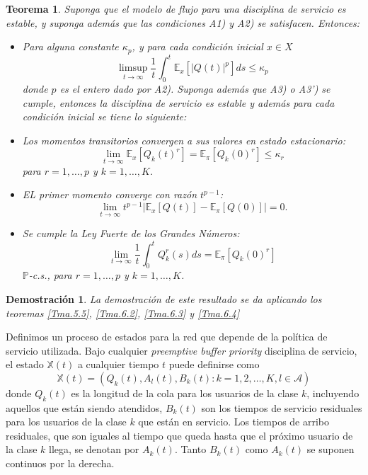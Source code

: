 \documentclass{article}
\newtheorem{Teo}{Teorema}[section]
\newtheorem{Dem}{Demostraci\'on}[section]
\newcommand{\esp}{\mathbb{E}}
\newcommand{\prob}{\mathbb{P}}
\numberwithin{equation}{section}
\begin{document}
\begin{Teo}\label{Tma.4.1}
Suponga que el modelo de flujo para una disciplina de servicio es
estable, y suponga adem\'as que las condiciones A1) y A2) se
satisfacen. Entonces:
\begin{itemize}
\item[i)] Para alguna constante $\kappa_{p}$, y para cada
condici\'on inicial $x\in X$
\begin{equation}
\limsup_{t\rightarrow\infty}\frac{1}{t}\int_{0}^{t}\esp_{x}\left[|Q\left(t\right)|^{p}\right]ds\leq\kappa_{p}
\end{equation}
donde $p$ es el entero dado por A2). Suponga adem\'as que A3) o A3')
se cumple, entonces la disciplina de servicio es estable y adem\'as
para cada condici\'on inicial se tiene lo siguiente: \item[ii)] Los
momentos transitorios convergen a sus valores en estado
estacionario:
\begin{equation}
\lim_{t\rightarrow\infty}\esp_{x}\left[Q_{k}\left(t\right)^{r}\right]=\esp_{\pi}\left[Q_{k}\left(0\right)^{r}\right]\leq\kappa_{r}
\end{equation}
para $r=1,\ldots,p$ y $k=1,\ldots,K$. \item[iii)] EL primer
momento converge con raz\'on $t^{p-1}$:
\begin{equation}
\lim_{t\rightarrow\infty}t^{p-1}|\esp_{x}\left[Q\left(t\right)\right]-\esp_{\pi}\left[Q\left(0\right)\right]|=0.
\end{equation}
\item[iv)] Se cumple la Ley Fuerte de los Grandes N\'umeros:
\begin{equation}
\lim_{t\rightarrow\infty}\frac{1}{t}\int_{0}^{t}Q_{k}^{r}\left(s\right)ds=\esp_{\pi}\left[Q_{k}\left(0\right)^{r}\right]
\end{equation}
$\prob$-c.s., para $r=1,\ldots,p$ y $k=1,\ldots,K$.
\end{itemize}
\end{Teo}
\begin{Dem}
La demostraci\'on de este resultado se da aplicando los teoremas
\ref{Tma.5.5}, \ref{Tma.6.2}, \ref{Tma.6.3} y \ref{Tma.6.4}
\end{Dem}


Definimos un proceso de estados para la red que depende de la
pol\'itica de servicio utilizada. Bajo cualquier {\em preemptive
buffer priority} disciplina de servicio, el estado
$\mathbb{X}\left(t\right)$ a cualquier tiempo $t$ puede definirse
como
\begin{equation}\label{Eq.Esp.Estados}
\mathbb{X}\left(t\right)=\left(Q_{k}\left(t\right),A_{l}\left(t\right),B_{k}\left(t\right):k=1,2,\ldots,K,l\in\mathcal{A}\right)
\end{equation}
donde $Q_{k}\left(t\right)$ es la longitud de la cola para los
usuarios de la clase $k$, incluyendo aquellos que est\'an siendo
atendidos, $B_{k}\left(t\right)$ son los tiempos de servicio
residuales para los usuarios de la clase $k$ que est\'an en
servicio. Los tiempos de arribo residuales, que son iguales al
tiempo que queda hasta que el pr\'oximo usuario de la clase $k$
llega, se denotan por $A_{k}\left(t\right)$. Tanto
$B_{k}\left(t\right)$ como $A_{k}\left(t\right)$ se suponen
continuos por la derecha.
\end{document}
